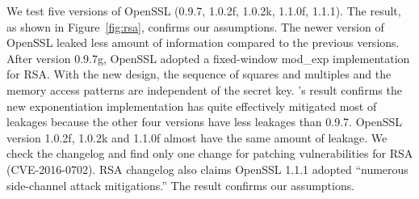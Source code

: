 We test five versions of OpenSSL (0.9.7, 1.0.2f, 1.0.2k, 1.1.0f, 1.1.1). The
result, as shown in Figure~\ref{fig:rsa}, confirms our assumptions. The newer
version of OpenSSL leaked less amount of information compared to the previous
versions. After version 0.9.7g, OpenSSL adopted a fixed-window mod\_exp
implementation for RSA\@. With the new design, the sequence of squares and
multiples and the memory access patterns are independent of the secret key.
\tool{}'s result confirms the new exponentiation implementation has quite
effectively mitigated most of leakages because the other four versions have less
leakages than 0.9.7. OpenSSL version 1.0.2f, 1.0.2k and 1.1.0f almost have the
same amount of leakage. We check the changelog and find only one change for
patching vulnerabilities for RSA (CVE-2016-0702). RSA changelog also claims
OpenSSL 1.1.1 adopted ``numerous side-channel attack mitigations.'' The result
confirms our assumptions.

